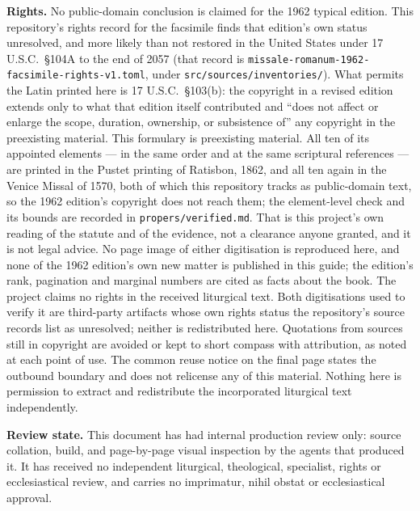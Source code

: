 \textbf{Rights.} No public-domain conclusion is claimed for the 1962 typical
edition. This repository's rights record for the facsimile finds that edition's
own status unresolved, and more likely than not restored in the United States
under 17 U.S.C.\ \S104A to the end of 2057 (that record is
\texttt{missale-romanum-1962-facsimile-rights-v1.toml}, under
\texttt{src/sources/inventories/}). What permits the Latin printed here is
17 U.S.C.\ \S103(b): the copyright in a revised edition extends only to what
that edition itself contributed and ``does not affect or enlarge the scope,
duration, ownership, or subsistence of'' any copyright in the preexisting
material. This formulary is preexisting material. All ten of its appointed
elements --- in the same order and at the same scriptural references --- are
printed in the Pustet printing of Ratisbon, 1862, and all ten again in the
Venice Missal of 1570, both of which this repository tracks as public-domain
text, so the 1962 edition's copyright does not reach them; the
element-level check and its bounds are recorded in \texttt{propers/verified.md}. That
is this project's own reading of the statute and of the evidence, not a
clearance anyone granted, and it is not legal advice. No page image of either
digitisation is reproduced here, and none of the 1962 edition's own new matter
is published in this guide; the edition's rank, pagination and marginal numbers
are cited as facts about the book. The project claims no rights in the received
liturgical text. Both digitisations used to verify it are third-party artifacts
whose own rights status the repository's source records list as unresolved;
neither is redistributed here. Quotations from sources still in copyright are
avoided or kept to short compass with attribution, as noted at each point of
use. The common reuse notice on the final page states the outbound boundary and
does not relicense any of this material. Nothing here is permission to extract
and redistribute the incorporated liturgical text independently.

\textbf{Review state.} This document has had internal production review only:
source collation, build, and page-by-page visual inspection by the agents that
produced it. It has received no independent liturgical, theological,
specialist, rights or ecclesiastical review, and carries no imprimatur, nihil
obstat or ecclesiastical approval.

